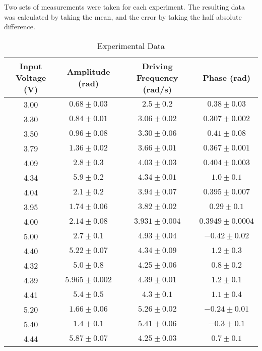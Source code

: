 Two sets of measurements were taken for each experiment. The resulting data was calculated by taking the mean, and the error by taking the half absolute difference. 

\begin{table}[H]
\centering
\caption{Experimental Data}
\label{tab:data}
\begin{tabular}{cccc}
\hline
\textbf{Input Voltage (V)} & \textbf{Amplitude (rad)} & \textbf{Driving Frequency (rad/s)} & \textbf{Phase (rad)} \\
\hline
3.00 & $0.68 \pm 0.03$   & $2.5 \pm 0.2$     & $0.38 \pm 0.03$ \\
3.30 & $0.84 \pm 0.01$   & $3.06 \pm 0.02$   & $0.307 \pm 0.002$ \\
3.50 & $0.96 \pm 0.08$   & $3.30 \pm 0.06$   & $0.41 \pm 0.08$ \\
3.79 & $1.36 \pm 0.02$   & $3.66 \pm 0.01$   & $0.367 \pm 0.001$ \\
4.09 & $2.8 \pm 0.3$     & $4.03 \pm 0.03$   & $0.404 \pm 0.003$ \\
4.34 & $5.9 \pm 0.2$     & $4.34 \pm 0.01$   & $1.0 \pm 0.1$ \\
4.04 & $2.1 \pm 0.2$     & $3.94 \pm 0.07$   & $0.395 \pm 0.007$ \\
3.95 & $1.74 \pm 0.06$   & $3.82 \pm 0.02$   & $0.29 \pm 0.1$ \\
4.00 & $2.14 \pm 0.08$   & $3.931 \pm 0.004$ & $0.3949 \pm 0.0004$ \\
5.00 & $2.7 \pm 0.1$     & $4.93 \pm 0.04$   & $-0.42 \pm 0.02$ \\
4.40 & $5.22 \pm 0.07$   & $4.34 \pm 0.09$   & $1.2 \pm 0.3$ \\
4.32 & $5.0 \pm 0.8$     & $4.25 \pm 0.06$   & $0.8 \pm 0.2$ \\
4.39 & $5.965 \pm 0.002$ & $4.39 \pm 0.01$   & $1.2 \pm 0.1$ \\
4.41 & $5.4 \pm 0.5$     & $4.3 \pm 0.1$     & $1.1 \pm 0.4$ \\
5.20 & $1.66 \pm 0.06$   & $5.26 \pm 0.02$   & $-0.24 \pm 0.01$ \\
5.40 & $1.4 \pm 0.1$     & $5.41 \pm 0.06$   & $-0.3 \pm 0.1$ \\
4.44 & $5.87 \pm 0.07$   & $4.25 \pm 0.03$   & $0.7 \pm 0.1$ \\
\end{tabular}
\end{table}

